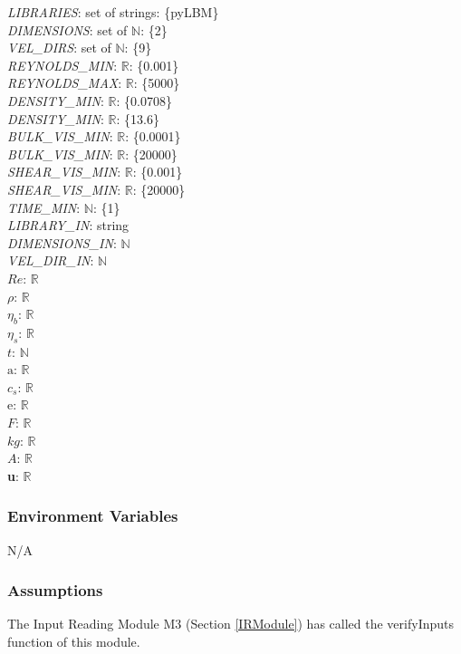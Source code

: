 \documentclass[12pt, titlepage]{article}
\begin{document}
\textit{LIBRARIES}: set of strings: \{pyLBM\}\\
\textit{DIMENSIONS}: set of $\mathbb{N}$: \{2\}\\
\textit{VEL\_DIRS}: set of $\mathbb{N}$: \{9\}\\
\textit{REYNOLDS\_MIN}: $\mathbb{R}$: \{0.001\}\\
\textit{REYNOLDS\_MAX}: $\mathbb{R}$: \{5000\}\\
\textit{DENSITY\_MIN}: $\mathbb{R}$: \{0.0708\}\\
\textit{DENSITY\_MIN}: $\mathbb{R}$: \{13.6\}\\
\textit{BULK\_VIS\_MIN}: $\mathbb{R}$: \{0.0001\}\\
\textit{BULK\_VIS\_MIN}: $\mathbb{R}$: \{20000\}\\
\textit{SHEAR\_VIS\_MIN}: $\mathbb{R}$: \{0.001\}\\
\textit{SHEAR\_VIS\_MIN}: $\mathbb{R}$: \{20000\}\\
\textit{TIME\_MIN}: $\mathbb{N}$: \{1\}\\
\textit{LIBRARY\_IN}: string\\
\textit{DIMENSIONS\_IN}: $\mathbb{N}$\\
\textit{VEL\_DIR\_IN}: $\mathbb{N}$\\
$Re$: $\mathbb{R}$\\
$\rho$: $\mathbb{R}$\\
$\eta_b$: $\mathbb{R}$\\
$\eta_s$: $\mathbb{R}$\\
$t$: $\mathbb{N}$\\
$\mathrm{a}$: $\mathbb{R}$\\
$c_s$: $\mathbb{R}$\\
$\mathrm{e}$: $\mathbb{R}$\\
$F$: $\mathbb{R}$\\
$kg$: $\mathbb{R}$\\
$A$: $\mathbb{R}$\\
\textbf{u}: $\mathbb{R}$\\

\subsubsection{Environment Variables}
N/A

\subsubsection{Assumptions}

The Input Reading Module M3 (Section \ref{IRModule}) has called the verifyInputs function of this module.
\end{document}

